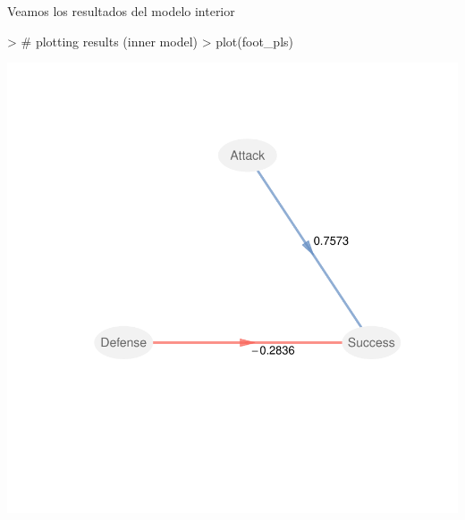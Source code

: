 \documentclass{paper}
\begin{document}
Veamos los resultados del modelo interior
\begin{center}
\begin{Schunk}
\begin{Sinput}
> # plotting results (inner model)
> plot(foot_pls)
\end{Sinput}
\end{Schunk}
\includegraphics{notas_PLS-015}
\end{center}
\end{document}
